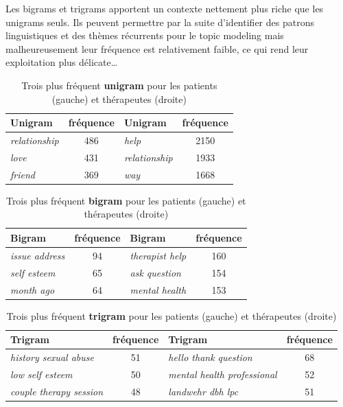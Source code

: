 \documentclass[12pt,a4paper]{article}
\begin{document}
Les bigrams et trigrams apportent un contexte nettement plus riche que les unigrams seuls.
Ils peuvent permettre par la suite d'identifier des patrons linguistiques et des thèmes récurrents
pour le topic modeling mais malheureusement leur fréquence est relativement faible,
ce qui rend leur exploitation plus délicate\dots


\vspace{10px}

\begin{table}[h]
\centering
\begin{tabularx}{0.65\textwidth}{lc||lc}
\toprule
\textbf{Unigram} & \textbf{fréquence} & \textbf{Unigram} & \textbf{fréquence}\\
\midrule
\textit{relationship} & 486 & \textit{help} & 2150\\
\textit{love} & 431 & \textit{relationship} & 1933\\
\textit{friend} & 369 & \textit{way} & 1668\\
\bottomrule
\end{tabularx}
\caption{Trois plus fréquent \textbf{unigram} pour les patients (gauche) et thérapeutes (droite)}
\end{table}

\vspace{10px}

\begin{table}[h]
\centering
\begin{tabularx}{0.65\textwidth}{lc||lc}
\toprule
\textbf{Bigram} & \textbf{fréquence} & \textbf{Bigram} & \textbf{fréquence}\\
\midrule
\textit{issue address} & 94 & \textit{therapist help} & 160\\
\textit{self esteem} & 65 & \textit{ask question} & 154\\
\textit{month ago} & 64 & \textit{mental health} & 153\\
\bottomrule
\end{tabularx}
\caption{Trois plus fréquent \textbf{bigram} pour les patients (gauche) et thérapeutes (droite)}
\end{table}

\vspace{10px}

\begin{table}[h]
\centering
\begin{tabularx}{0.9\textwidth}{lc||lc}
\toprule
\textbf{Trigram} & \textbf{fréquence} & \textbf{Trigram} & \textbf{fréquence}\\
\midrule
\textit{history sexual abuse} & 51 & \textit{hello thank question} & 68\\
\textit{low self esteem} & 50 & \textit{mental health professional} & 52\\
\textit{couple therapy session} & 48 & \textit{landwehr dbh lpc} & 51\\
\bottomrule
\end{tabularx}
\caption{Trois plus fréquent \textbf{trigram} pour les patients (gauche) et thérapeutes (droite)}
\end{table}
\end{document}
